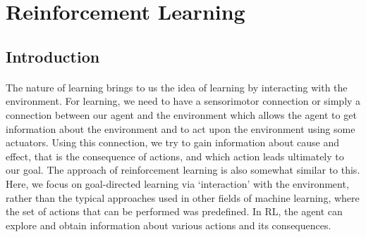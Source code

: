 \documentclass{article}
\begin{document}
















\section{Reinforcement Learning}
  \subsection{Introduction}
    \paragraph{} The nature of learning brings to us the idea of learning by interacting with the environment. For learning, we need to have a sensorimotor connection or simply a connection between our agent and the environment which allows the agent to get information about the environment and to act upon the environment using some actuators. Using this connection, we try to gain information about cause and effect, that is the consequence of actions, and which action leads ultimately to our goal. The approach of reinforcement learning is also somewhat similar to this. Here, we focus on goal-directed learning via ‘interaction’ with the environment, rather than the typical approaches used in other fields of machine learning, where the set of actions that can be performed was predefined. In RL, the agent can explore and obtain information about various actions and its consequences. 
\end{document}
